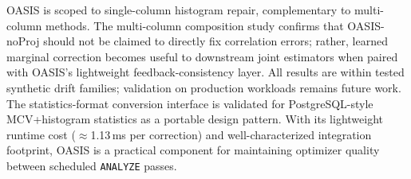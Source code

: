 \documentclass[runningheads]{llncs}
\begin{document}
OASIS is scoped to single-column histogram repair, complementary to multi-column methods. The multi-column composition study confirms that OASIS-noProj should not be claimed to directly fix correlation errors; rather, learned marginal correction becomes useful to downstream joint estimators when paired with OASIS's lightweight feedback-consistency layer. All results are within tested synthetic drift families; validation on production workloads remains future work. The statistics-format conversion interface is validated for PostgreSQL-style MCV+histogram statistics as a portable design pattern. With its lightweight runtime cost ($\approx$1.13\,ms per correction) and well-characterized integration footprint, OASIS is a practical component for maintaining optimizer quality between scheduled \texttt{ANALYZE} passes.



\end{document}
